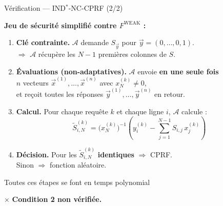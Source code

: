 \documentclass{beamer}
\begin{document}
\begin{frame}{Vérification --- IND$^*$-NC-CPRF (2/2)}
 
\textbf{Jeu de sécurité simplifié contre $F^{\mathrm{WEAK}}$ :}
 
 
\begin{enumerate}
 
    \item[\textbf{1.}] \textbf{Clé contrainte.} $\mathcal{A}$ demande $S_{\vec{y}}$ pour $\vec{y} = (0,\ldots,0,1)$.\\
    $\Rightarrow$ $\mathcal{A}$ récupère les $N-1$ premières colonnes de $S$.
 
 
    \item[\textbf{2.}] \textbf{Évaluations (non-adaptatives).} $\mathcal{A}$ envoie \textbf{en une seule fois}\\
    $n$ vecteurs $\vec{x}^{(1)}, \ldots, \vec{x}^{(n)}$ avec $x^{(k)}_N \neq 0$,\\
    et reçoit toutes les réponses $\vec{y}^{(1)}, \ldots, \vec{y}^{(n)}$ en retour.
 
 
    \item[\textbf{3.}] \textbf{Calcul.} Pour chaque requête $k$ et chaque ligne $i$, $\mathcal{A}$ calcule :
    \[
    \tilde{S}_{i,N}^{(k)} = \bigl(x^{(k)}_N\bigr)^{-1}\!\left(y^{(k)}_i - \sum_{j=1}^{N-1} S_{i,j}\, x^{(k)}_j\right)
    \]
 
 
    \item[\textbf{4.}] \textbf{Décision.} Pour les $\tilde{S}_{i,N}^{(k)}$ \textbf{identiques} $\Rightarrow$ CPRF.\\
    Sinon $\Rightarrow$ fonction aléatoire.
\end{enumerate}
 
Toutes ces étapes se font en temps polynomial
 
\textcolor{red!60!black}{$\times$} \textbf{Condition 2 non vérifiée.}
 
\end{frame}
 
\end{document}
